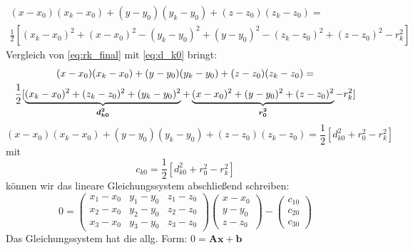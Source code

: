 \begin{multline}\label{eq:rk_final}
(x-x_0)(x_k-x_0)+(y-y_0)(y_k-y_0)+(z-z_0)(z_k-z_0)= \\\frac{1}{2}[(x_k-x_0)^2+(x-x_0)^2-(y_k-y_0)^2 +(y-y_0)^2-(z_k-z_0)^2 +(z-z_0)^2-r_k^2]
\end{multline}
%
Vergleich von \eqref{eq:rk_final} mit \eqref{eq:d_k0} bringt: 
%
\begin{multline}
(x-x_0)(x_k-x_0)+(y-y_0)(y_k-y_0)+(z-z_0)(z_k-z_0)= \\\frac{1}{2}[\underbrace{(x_k-x_0)^2+(z_k-z_0)^2+(y_k-y_0)^2}_\text{\boldmath{$d_{k0}^2$}}+\underbrace{(x-x_0)^2+(y-y_0)^2 +(z-z_0)^2}_\text{\boldmath{$r_0^2$}}-r_k^2]
\end{multline}
\begin{equation}
(x-x_0)(x_k-x_0)+(y-y_0)(y_k-y_0)+(z-z_0)(z_k-z_0)=\frac{1}{2}[d_{k0}^2+r_{0}^2-r_k^2]\label{eq:rk_final_simplyfied}
\end{equation}
mit 
\begin{equation}
c_{k0}=\frac{1}{2}[d_{k0}^2+r_{0}^2-r_k^2]\label{eq:c_k0}
\end{equation}
können wir das lineare Gleichungssystem abschließend schreiben:
%
\begin{equation}
0=
\left(
	\begin{array}{ccc}
		x_1-x_0 & y_1-y_0 & z_1-z_0 \\
		x_2-x_0 & y_2-y_0 & z_2-z_0 \\
		x_3-x_0 & y_3-y_0 & z_3-z_0
	\end{array}
\right)
\left(
   \begin{array}{c}
	   x-x_0\\
	   y-y_0\\
	   z-z_0
   \end{array}
\right)
-
\left(
	\begin{array}{c}
c_{10}\\
c_{20}\\
c_{30}
	\end{array}
\right)
\end{equation}
%
Das Gleichungssystem hat die allg. Form: $0 = \mathbf{Ax}+\mathbf{b}$

